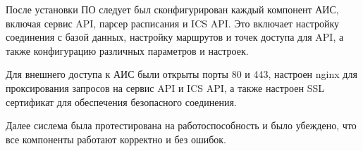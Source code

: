 После установки ПО следует был сконфигурирован каждый компонент АИС, 
включая сервис API, парсер расписания и ICS API. 
Это включает настройку соединения с базой данных, 
настройку маршрутов и точек доступа для API, 
а также конфигурацию различных параметров и настроек.

Для внешнего доступа к АИС были открыты порты 80 и 443,
настроен nginx для проксирования запросов на сервис API и ICS API,
а также настроен SSL сертификат для обеспечения безопасного соединения.

Далее сислема была протестирована на работоспособность и было убеждено,
что все компоненты работают корректно и без ошибок.